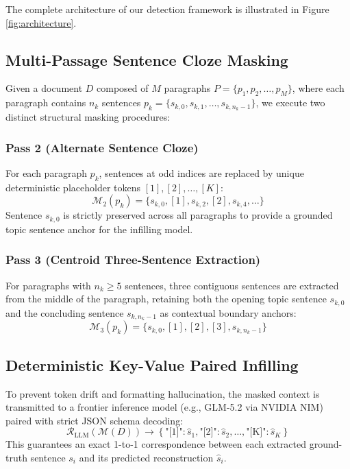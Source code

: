 \documentclass[conference]{IEEEtran}
\begin{document}
The complete architecture of our detection framework is illustrated in Figure \ref{fig:architecture}.

\subsection{Multi-Passage Sentence Cloze Masking}
Given a document $D$ composed of $M$ paragraphs $P = \{p_1, p_2, \dots, p_M\}$, where each paragraph contains $n_k$ sentences $p_k = \{s_{k,0}, s_{k,1}, \dots, s_{k,n_k-1}\}$, we execute two distinct structural masking procedures:

\subsubsection{Pass 2 (Alternate Sentence Cloze)}
For each paragraph $p_k$, sentences at odd indices are replaced by unique deterministic placeholder tokens $[1], [2], \dots, [K]$:
\begin{equation}
\mathcal{M}_2(p_k) = \{s_{k,0}, [1], s_{k,2}, [2], s_{k,4}, \dots\}
\end{equation}
Sentence $s_{k,0}$ is strictly preserved across all paragraphs to provide a grounded topic sentence anchor for the infilling model.

\subsubsection{Pass 3 (Centroid Three-Sentence Extraction)}
For paragraphs with $n_k \ge 5$ sentences, three contiguous sentences are extracted from the middle of the paragraph, retaining both the opening topic sentence $s_{k,0}$ and the concluding sentence $s_{k,n_k-1}$ as contextual boundary anchors:
\begin{equation}
\mathcal{M}_3(p_k) = \{s_{k,0}, [1], [2], [3], s_{k,n_k-1}\}
\end{equation}

\subsection{Deterministic Key-Value Paired Infilling}
To prevent token drift and formatting hallucination, the masked context is transmitted to a frontier inference model (e.g., GLM-5.2 via NVIDIA NIM) paired with strict JSON schema decoding:
\begin{equation}
\mathcal{R}_{\text{LLM}}(\mathcal{M}(D)) \rightarrow \left\{ \text{"[1]"}: \hat{s}_1, \text{"[2]"}: \hat{s}_2, \dots, \text{"[K]"}: \hat{s}_K \right\}
\end{equation}
This guarantees an exact 1-to-1 correspondence between each extracted ground-truth sentence $s_i$ and its predicted reconstruction $\hat{s}_i$.
\end{document}
